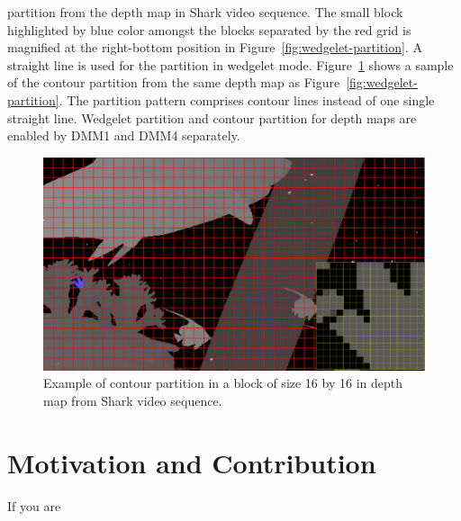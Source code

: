 partition from the depth map in Shark video sequence.
The small block highlighted by blue color amongst the blocks
separated by the red grid is magnified at the right-bottom position in
Figure~\ref{fig:wedgelet-partition}.
A straight line is used for the partition in wedgelet mode.
Figure~\ref{fig:contour-partition} shows a sample of the contour partition
from the same depth map as Figure~\ref{fig:wedgelet-partition}.
The partition pattern comprises contour lines instead of one single
straight line.
Wedgelet partition and contour partition for depth maps
are enabled by DMM1 and DMM4 separately.
\begin{figure}
    \centering
    \includegraphics[width=\textwidth,height=\textheight,keepaspectratio]{Figures/contour}
    \caption[Contour partition illustration]
    {Example of contour partition in a block of size 16 by 16 in depth map
    from Shark video sequence.
    }
    \label{fig:contour-partition}
\end{figure}


\section{Motivation and Contribution}\label{sec:motivation_and_contribution}
If you are

